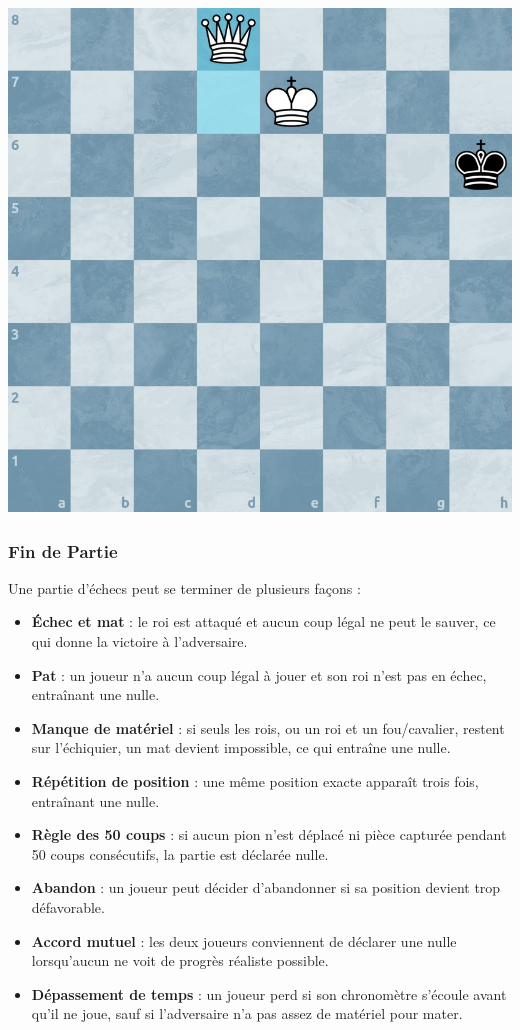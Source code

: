 \documentclass{article}
\begin{document}
 \begin{minipage}{0.48\textwidth}
     \centering
     \includegraphics[width=\textwidth, height=\textwidth]{promotion2.png}
     \vspace{0.5cm}
 \end{minipage}

\subsubsection{Fin de Partie}
Une partie d'échecs peut se terminer de plusieurs façons :
\begin{itemize}
    \item \textbf{Échec et mat} : le roi est attaqué et aucun coup légal ne peut le sauver, ce qui donne la victoire à l'adversaire.
    \item \textbf{Pat} : un joueur n’a aucun coup légal à jouer et son roi n’est pas en échec, entraînant une nulle.
    \item \textbf{Manque de matériel} : si seuls les rois, ou un roi et un fou/cavalier, restent sur l'échiquier, un mat devient impossible, ce qui entraîne une nulle.
    \item \textbf{Répétition de position} : une même position exacte apparaît trois fois, entraînant une nulle.
    \item \textbf{Règle des 50 coups} : si aucun pion n’est déplacé ni pièce capturée pendant 50 coups consécutifs, la partie est déclarée nulle.
    \item \textbf{Abandon} : un joueur peut décider d’abandonner si sa position devient trop défavorable.
    \item \textbf{Accord mutuel} : les deux joueurs conviennent de déclarer une nulle lorsqu'aucun ne voit de progrès réaliste possible.
    \item \textbf{Dépassement de temps} : un joueur perd si son chronomètre s’écoule avant qu’il ne joue, sauf si l’adversaire n’a pas assez de matériel pour mater.
\end{itemize}
\end{document}
